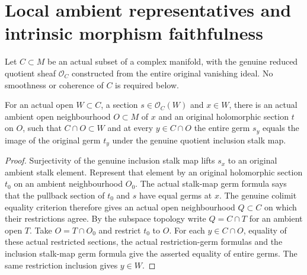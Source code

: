 \section{Local ambient representatives and intrinsic morphism faithfulness}

Let $C\subset M$ be an actual subset of a complex manifold, with the genuine
reduced quotient sheaf $\mathcal O_C$ constructed from the entire original
vanishing ideal. No smoothness or coherence of $C$ is required below.

\begin{theorem}
\label{hir:actual-analytic-subspace-local-ambient-section}
\leanok
For an actual open $W\subset C$, a section $s\in\mathcal O_C(W)$ and $x\in W$,
there is an actual ambient open neighbourhood $O\subset M$ of $x$ and an
original holomorphic section $t$ on $O$, such that $C\cap O\subset W$ and
at every $y\in C\cap O$ the entire germ $s_y$ equals the image of the
original germ $t_y$ under the genuine quotient inclusion stalk map.
\end{theorem}
\begin{proof}
Surjectivity of the genuine inclusion stalk map lifts $s_x$ to an original
ambient stalk element. Represent that element by an original holomorphic
section $t_0$ on an ambient neighbourhood $O_0$. The actual stalk-map germ
formula says that the pullback section of $t_0$ and $s$ have equal germs at
$x$. The genuine colimit equality criterion therefore gives an actual open
neighbourhood $Q\subset C$ on which their restrictions agree. By the
subspace topology write $Q=C\cap T$ for an ambient open $T$. Take
$O=T\cap O_0$ and restrict $t_0$ to $O$. For each $y\in C\cap O$, equality
of these actual restricted sections, the actual restriction-germ formulas
and the inclusion stalk-map germ formula give the asserted equality of
entire germs. The same restriction inclusion gives $y\in W$.
\end{proof}

